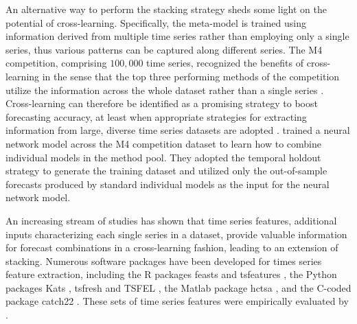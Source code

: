 \documentclass[11pt]{article}
\newcommand{\pkg}[1]{{\normalfont\fontseries{b}\selectfont #1}}
\let\proglang=\textsf
\begin{document}
An alternative way to perform the stacking strategy sheds some light on the potential of cross-learning. Specifically, the meta-model is trained using information derived from multiple time series rather than employing only a single series, thus various patterns can be captured along different series. The M4 competition, comprising $100,000$ time series, recognized the benefits of cross-learning in the sense that the top three performing methods of the competition utilize the information across the whole dataset rather than a single series \citep{Makridakis2020-hu}. Cross-learning can therefore be identified as a promising strategy to boost forecasting accuracy, at least when appropriate strategies for extracting information from large, diverse time series datasets are adopted \citep{Kang2020-sa,Semenoglou2020-xx}. \citet{Zhao2020-ep} trained a neural network model across the M4 competition dataset to learn how to combine individual models in the method pool. They adopted the temporal holdout strategy to generate the training dataset and utilized only the out-of-sample forecasts produced by standard individual models as the input for the neural network model.

An increasing stream of studies has shown that time series features, additional inputs characterizing each single series in a dataset, provide valuable information for forecast combinations in a cross-learning fashion, leading to an extension of stacking. Numerous software packages have been developed for times series feature extraction, including the \proglang{R} packages \pkg{feasts} \citep{rfeasts} and \pkg{tsfeatures} \citep{rtsfeatures}, the \proglang{Python} packages \pkg{Kats} \citep{pKats}, \pkg{tsfresh} \citep{Christ2018-vi} and \pkg{TSFEL} \citep{Barandas2020-vr}, the \proglang{Matlab} package \pkg{hctsa} \citep{Fulcher2017-uf}, and the \proglang{C}-coded package \pkg{catch22} \citep{Lubba2019-ds}. These sets of time series features were empirically evaluated by \citet{Henderson2021-gl}.
\end{document}
